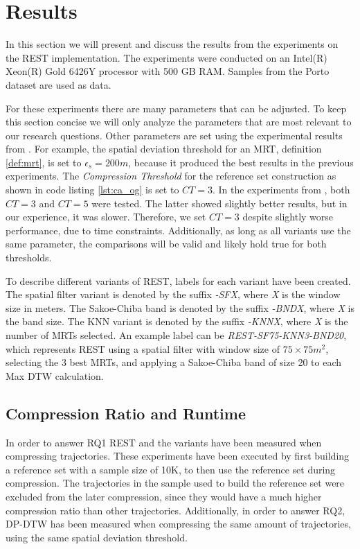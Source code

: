 \chapter{Results}
\label{chap:res}
In this section we will present and discuss the results from the experiments on the REST implementation. The experiments were conducted on an Intel(R) Xeon(R) Gold 6426Y processor with 500 GB RAM. Samples from the Porto dataset are used as data.

For these experiments there are many parameters that can be adjusted. To keep this section concise we will only analyze the parameters that are most relevant to our research questions. Other parameters are set using the experimental results from \textcite{zhao2018rest}. For example, the spatial deviation threshold for an MRT, definition \ref{def:mrt}, is set to $\epsilon_s = 200 m$, because it produced the best results in the previous experiments. The \textit{Compression Threshold} for the reference set construction as shown in code listing \ref{lst:ca_og} is set to $CT = 3$. In the experiments from \textcite{zhao2018rest}, both $CT =3$ and $CT = 5$ were tested. The latter showed slightly better results, but in our experience, it was slower. Therefore, we set $CT = 3$ despite slightly worse performance, due to time constraints. Additionally, as long as all variants use the same parameter, the comparisons will be valid and likely hold true for both thresholds.

To describe different variants of REST, labels for each variant have been created. The spatial filter variant is denoted by the suffix \textit{-SFX}, where \textit{X} is the window size in meters. The Sakoe-Chiba band is denoted by the suffix \textit{-BNDX}, where \textit{X} is the band size. The KNN variant is denoted by the suffix \textit{-KNNX}, where \textit{X} is the number of MRTs selected. An example label can be \textit{REST-SF75-KNN3-BND20}, which represents REST using a spatial filter with window size of $75\times75 m^2$, selecting the 3 best MRTs, and applying a Sakoe-Chiba band of size 20 to each Max DTW calculation.

\section{Compression Ratio and Runtime}
In order to answer RQ1 REST and the variants have been measured when compressing trajectories. These experiments have been executed by first building a reference set with a sample size of 10K, to then use the reference set during compression. The trajectories in the sample used to build the reference set were excluded from the later compression, since they would have a much higher compression ratio than other trajectories. Additionally, in order to answer RQ2, DP-DTW has been measured when compressing the same amount of trajectories, using the same spatial deviation threshold.


